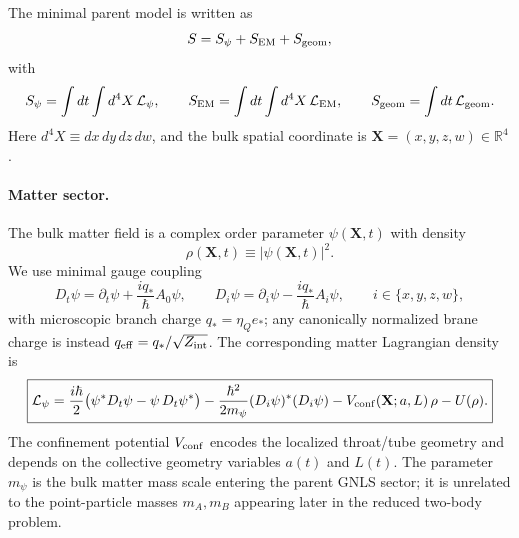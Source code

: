 \documentclass[11pt]{article}
\newcommand{\etaQ}{\eta_Q}
\newcommand{\qstar}{q_*}
\newcommand{\estar}{e_*}
\newcommand{\qeff}{q_{\mathrm{eff}}}
\begin{document}
The minimal parent model is written as
\begin{equation}
S = S_\psi + S_{\rm EM} + S_{\rm geom},
\label{eq:app-total-action}
\end{equation}
with
\begin{equation}
S_\psi = \int dt \int d^4X\, \mathcal L_\psi,
\qquad
S_{\rm EM} = \int dt \int d^4X\, \mathcal L_{\rm EM},
\qquad
S_{\rm geom} = \int dt\, \mathcal L_{\rm geom}.
\label{eq:app-sector-actions}
\end{equation}
Here \(d^4X\equiv dx\,dy\,dz\,dw\), and the bulk spatial coordinate is
\(\mathbf X=(x,y,z,w)\in\mathbb R^4\).

\paragraph{Matter sector.}
The bulk matter field is a complex order parameter \(\psi(\mathbf X,t)\) with density
\begin{equation}
\rho(\mathbf X,t)\equiv |\psi(\mathbf X,t)|^2.
\label{eq:app-density}
\end{equation}
We use minimal gauge coupling
\begin{equation}
D_t\psi = \partial_t\psi + \frac{i \qstar}{\hbar}A_0\psi,
\qquad
D_i\psi = \partial_i\psi - \frac{i \qstar}{\hbar}A_i\psi,
\qquad
i\in\{x,y,z,w\},
\label{eq:app-cov-derivs}
\end{equation}
with microscopic branch charge \(\qstar=\etaQ\estar\); any canonically normalized brane
charge is instead \(\qeff=\qstar/\sqrt{Z_{\rm int}}\).
The corresponding matter Lagrangian density is
\begin{equation}
\boxed{
\mathcal L_\psi
=
\frac{i\hbar}{2}\bigl(\psi^*D_t\psi-\psi\,D_t\psi^*\bigr)
-\frac{\hbar^2}{2m_\psi}(D_i\psi)^*(D_i\psi)
- V_{\rm conf}(\mathbf X;a,L)\,\rho
- U(\rho).
}
\label{eq:app-Lpsi}
\end{equation}
The confinement potential \(V_{\rm conf}\) encodes the localized throat/tube geometry and
depends on the collective geometry variables \(a(t)\) and \(L(t)\). The parameter
\(m_\psi\) is the bulk matter mass scale entering the parent GNLS sector; it is unrelated
to the point-particle masses \(m_A,m_B\) appearing later in the reduced two-body problem.
\end{document}
